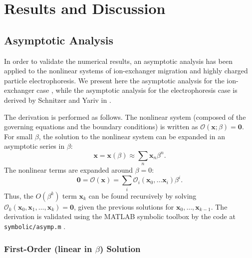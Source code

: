 \documentclass[MSc,beforeExam]{iitcsthesis}
\newcommand\bx{\boldsymbol{x}}
\newcommand\bzero{\boldsymbol{0}}
\newcommand\cO{\mathcal{O}}
\begin{document}
\chapter{Results and Discussion} \label{ch:results}

\section{Asymptotic Analysis} \label{sec:asymp}
In order to validate the numerical results, an asymptotic analysis has been applied 
to the nonlinear systems of ion-exchanger migration 
and highly charged particle electrophoresis.
We present here the asymptotic analysis for the ion-exchanger case \cite{yariv2010migration},
while the asymptotic analysis for the electrophoresis case \cite{schnitzer2012surface}
is derived by Schnitzer and Yariv in \cite{schnitzer2012cubic}.

The derivation is performed as follows.
The nonlinear system (composed of the governing equations and the boundary conditions) 
is written as $\cO(\bx;\beta) = \bzero$.
For small $\beta$, the solution to the nonlinear system can be expanded in an asymptotic series in $\beta$:
\begin{equation}
\bx = \bx(\beta) \approx \sum_n \bx_n \beta^n.
\end{equation}
The nonlinear terms
are expanded around $\beta = 0$:
\begin{equation}
\bzero = \cO(\bx) = \sum_i \cO_i(\bx_0, \ldots \bx_i) \beta^i.
\end{equation}
Thus, the $O(\beta^k)$ term $\bx_k$ can be found recursively by solving 
$\cO_k(\bx_0, \bx_1, \ldots, \bx_k) = \bzero$,
given the previous solutions for $\bx_0, \ldots, \bx_{k-1}$.
The derivation is validated using the MATLAB symbolic toolbox by the code 
at \verb|symbolic/asymp.m| \cite{source}.

\subsection{First-Order (linear in $\beta$) Solution} \label{app:linear}
\end{document}
